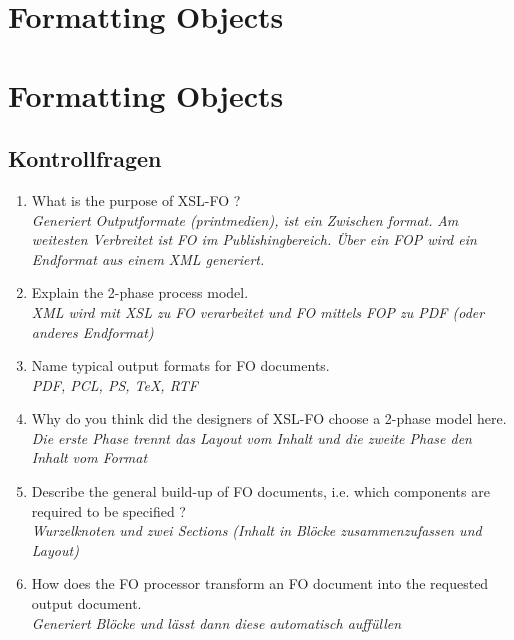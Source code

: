 \chapter{Formatting Objects}


\chapter{Formatting Objects}

\section{Kontrollfragen}
\begin{enumerate}
\item What is the purpose of XSL-FO ?\\
\textit{Generiert Outputformate (printmedien), ist ein Zwischen format.}
\textit{Am weitesten Verbreitet ist FO im Publishingbereich. Über ein FOP wird ein Endformat aus einem XML generiert.
}


\item Explain the 2-phase process model.\\
\textit{XML wird mit XSL zu FO verarbeitet und FO mittels FOP zu PDF (oder anderes Endformat)}

\item Name typical output formats for FO documents.\\
\textit{PDF, PCL, PS, TeX, RTF}

\item Why do you think did the designers of XSL-FO choose a 2-phase model here.\\
\textit{Die erste Phase trennt das Layout vom Inhalt und die zweite Phase den Inhalt vom Format}


\item Describe the general build-up of FO documents, i.e. which components are required to be specified ?\\
\textit{Wurzelknoten und zwei Sections (Inhalt in Blöcke zusammenzufassen und Layout)}

\item How does the FO processor transform an FO document into the requested output document.\\
\textit{Generiert Blöcke und lässt dann diese automatisch auffüllen}

\end{enumerate}
